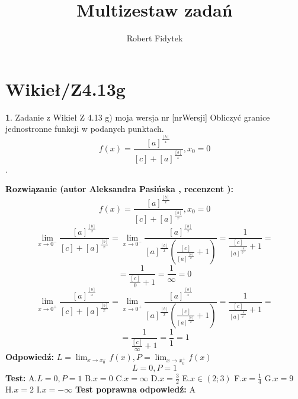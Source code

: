 \documentclass[12pt, a4paper]{article}
\title{Multizestaw zadań}
\author{Robert Fidytek}
\date{}
\theoremstyle{definition} %
\newtheorem{zad}{}
\newcommand{\kategoria}[1]{\section{#1}} %
\newcommand{\zadStart}[1]{\begin{zad}#1\newline} %
\newcommand{\zadStop}{\end{zad}}   %
\newcommand{\rozwStart}[2]{\noindent \textbf{Rozwiązanie (autor #1 , recenzent #2): }\newline} %
\newcommand{\rozwStop}{\newline}                                            %
\newcommand{\odpStart}{\noindent \textbf{Odpowiedź:}\newline}    %
\newcommand{\odpStop}{\newline}                                             %
\newcommand{\testStart}{\noindent \textbf{Test:}\newline} %
\newcommand{\testStop}{\newline} %
\newcommand{\kluczStart}{\noindent \textbf{Test poprawna odpowiedź:}\newline} %
\newcommand{\kluczStop}{\newline} %
\begin{document}
\maketitle


\kategoria{Wikieł/Z4.13g}
\zadStart{Zadanie z Wikieł Z 4.13 g) moja wersja nr [nrWersji]}
Obliczyć granice jednostronne funkcji w podanych punktach. $$f(x)=\frac{[a]^{\frac{[b]}{x}}}{[c]+[a]^{\frac{[b]}{x}}},x_{0}=0$$.
\zadStop
\rozwStart{Aleksandra Pasińska}{}
$$f(x)=\frac{[a]^{\frac{[b]}{x}}}{[c]+[a]^{\frac{[b]}{x}}},x_{0}=0$$
$$\lim_{x\rightarrow 0^-}\frac{[a]^{\frac{[b]}{x}}}{[c]+[a]^{\frac{[b]}{x}}}=\lim_{x\rightarrow 0^-}\frac{[a]^{\frac{[b]}{x}}}{[a]^{\frac{[b]}{x}}(\frac{[c]}{[a]^{\frac{[b]}{x}}}+1)}=\frac{1}{\frac{[c]}{[a]^{\frac{[b]}{0^-}}}+1}=$$ 
$$=\frac{1}{\frac{[c]}{0}+1}=\frac{1}{\infty}=0$$ 
$$\lim_{x\rightarrow 0^+}\frac{[a]^{\frac{[b]}{x}}}{[c]+[a]^{\frac{[b]}{x}}}=\lim_{x\rightarrow 0^+}\frac{[a]^{\frac{[b]}{x}}}{[a]^{\frac{[b]}{x}}(\frac{[c]}{[a]^{\frac{[b]}{x}}}+1)}=\frac{1}{\frac{[c]}{[a]^{\frac{[b]}{0^+}}}+1}=$$ 
$$=\frac{1}{\frac{[c]}{\infty}+1}=\frac{1}{1}=1$$
\rozwStop
\odpStart
$ L=\lim_{x\rightarrow x_{0}^-}f(x), P=\lim_{x\rightarrow x_{0}^+}f(x)$
$$L=0, P=1$$
\odpStop
\testStart
A.$ L=0, P=1 $
B.$x=0$
C.$x=\infty$
D.$x=\frac{3}{2}$
E.$x\in (2;3)$
F.$x=\frac{1}{4}$
G.$x=9$
H.$x=2$
I.$x=-\infty$
\testStop
\kluczStart
A
\kluczStop
\end{document}
